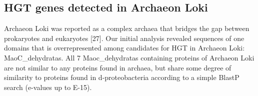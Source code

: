\subsection{HGT genes detected in Archaeon Loki}
Archaeon Loki was reported as a complex archaea that bridges the gap between
prokaryotes and eukaryotes [27]. Our initial analysis revealed sequences of one
domains that is overrepresented among candidates for HGT in Archaeon Loki:
MaoC\_dehydratas. All 7 Maoc\_dehydratas containing proteins of Archaeon Loki are
not similar to any proteins found in archaea, but share some degree of
similarity to proteins found in d-proteobacteria according to a simple BlastP
search (e-values up to E-15).
